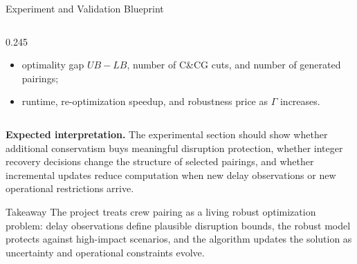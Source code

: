 \documentclass[final]{beamer}
\begin{document}
\begin{frame}[t]
\begin{minipage}[t]{0.968\textwidth}
\begin{block}{Experiment and Validation Blueprint}
\begin{columns}[T,totalwidth=\linewidth]
\begin{column}{0.245\linewidth}
\begin{itemize}
  \item optimality gap \(UB-LB\), number of C\&CG cuts, and number of generated pairings;
  \item runtime, re-optimization speedup, and robustness price as \(\Gamma\) increases.
\end{itemize}
\end{column}
\end{columns}
\vspace{0.12cm}
\scriptsize
\textbf{Expected interpretation.}
The experimental section should show whether additional conservatism buys meaningful disruption protection, whether integer recovery decisions change the structure of selected pairings, and whether incremental updates reduce computation when new delay observations or new operational restrictions arrive.
\end{block}

\begin{alertblock}{Takeaway}
The project treats crew pairing as a living robust optimization problem: delay observations define plausible disruption bounds, the robust model protects against high-impact scenarios, and the algorithm updates the solution as uncertainty and operational constraints evolve.
\end{alertblock}

\end{minipage}
\end{frame}
\end{document}
